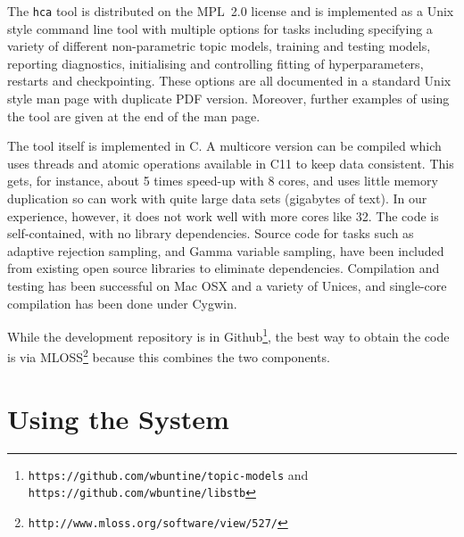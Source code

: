 \documentclass[twoside,11pt]{article}
\begin{document}
The {\tt hca} tool is distributed on the MPL~2.0 license
and is implemented as a Unix style command line tool
with multiple options for tasks including
specifying a variety of different non-parametric topic models,
training and testing models,
reporting diagnostics, initialising and controlling fitting of
hyperparameters, restarts and checkpointing.
These options are all documented in a standard Unix style man page with
duplicate PDF version.  Moreover, further examples of using the tool
are given at the end of the man page.

The tool itself is implemented in C.  A multicore version
can be compiled which uses threads and atomic operations available in C11
to keep data consistent. This gets, for instance, about 5 times speed-up
with 8 cores, and uses little memory duplication so can work with
quite large data sets (gigabytes of text).
In our experience, however, it does not work well with more cores like 32.
The code is self-contained, with no library dependencies.
Source code for tasks such as
adaptive rejection sampling, and Gamma variable sampling,
have been included from existing open source libraries
to eliminate dependencies.
Compilation and testing has been successful on Mac OSX and a variety of Unices,
and single-core compilation has been done under Cygwin.

While the development repository is in Github\footnote{{\tt https://github.com/wbuntine/topic-models} and {\tt https://github.com/wbuntine/libstb}},
the best way to obtain the code is via MLOSS\footnote{\tt http://www.mloss.org/software/view/527/} because this combines the two components.

\section{Using the System}
\end{document}
